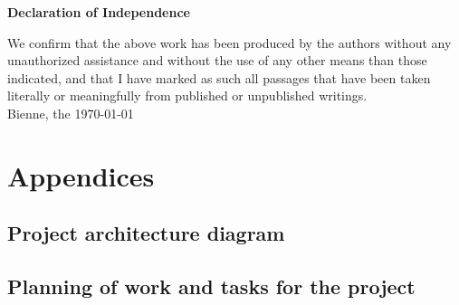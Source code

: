 \documentclass[12pt,a4paper]{scrartcl}
\begin{document}
\markboth{}{}

\newpage



\newpage

\markboth{}{}
  \normalsize
\begin{center}
\huge{\textbf{ Declaration of Independence}}\\[40mm]
\end{center}
\large
We confirm that the above work has been produced by the authors without any unauthorized assistance and without the use of any other means than those indicated, and that I have marked as such all passages that have been taken literally or meaningfully from published or unpublished writings.\\[50mm]
Bienne, the \today

\newpage
\appendix
\section*{Appendices}
\renewcommand{\thesubsection}{\Alph{subsection}}

\subsection{Project architecture diagram}


\subsection{Planning of work and tasks for the project}

\end{document}
